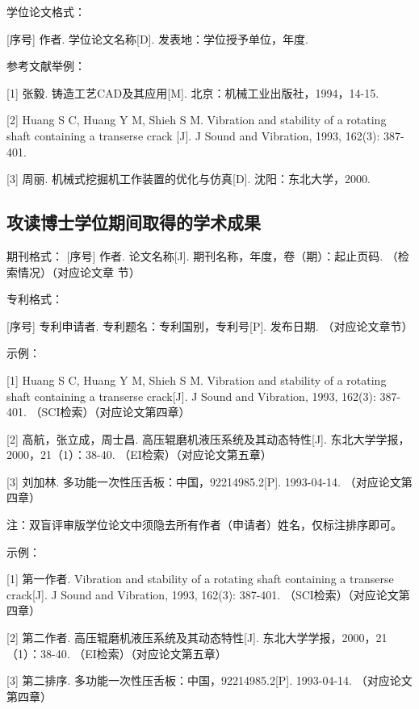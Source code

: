 学位论文格式： 

[序号] 作者. 学位论文名称[D]. 发表地：学位授予单位，年度.

参考文献举例： 

[1] 张毅. 铸造工艺CAD及其应用[M]. 北京：机械工业出版社，1994，14-15. 

[2] Huang S C, Huang Y M, Shieh S M. Vibration and stability of a rotating shaft containing a transerse crack [J]. J Sound and Vibration, 1993, 162(3): 387-401.

[3] 周丽. 机械式挖掘机工作装置的优化与仿真[D]. 沈阳：东北大学，2000.


\subsection{攻读博士学位期间取得的学术成果}

期刊格式：
[序号] 作者. 论文名称[J]. 期刊名称，年度，卷（期）：起止页码. （检索情况）（对应论文章
节）

专利格式：

[序号] 专利申请者. 专利题名：专利国别，专利号[P]. 发布日期. （对应论文章节）

示例：

[1] Huang S C, Huang Y M, Shieh S M. Vibration and stability of a rotating shaft containing a transerse crack[J]. J Sound and Vibration, 1993, 162(3): 387-401. （SCI检索）（对应论文第四章）

[2] 高航，张立成，周士昌. 高压辊磨机液压系统及其动态特性[J]. 东北大学学报，2000，21（1）：38-40. （EI检索）（对应论文第五章）

[3] 刘加林. 多功能一次性压舌板：中国，92214985.2[P]. 1993-04-14. （对应论文第四章）


注：双盲评审版学位论文中须隐去所有作者（申请者）姓名，仅标注排序即可。

示例：

[1] 第一作者. Vibration and stability of a rotating shaft containing a transerse crack[J]. J Sound and Vibration, 1993, 162(3): 387-401. （SCI检索）（对应论文第四章）

[2] 第二作者. 高压辊磨机液压系统及其动态特性[J]. 东北大学学报，2000，21（1）：38-40. （EI检索）（对应论文第五章）

[3] 第二排序. 多功能一次性压舌板：中国，92214985.2[P]. 1993-04-14. （对应论文第四章）



